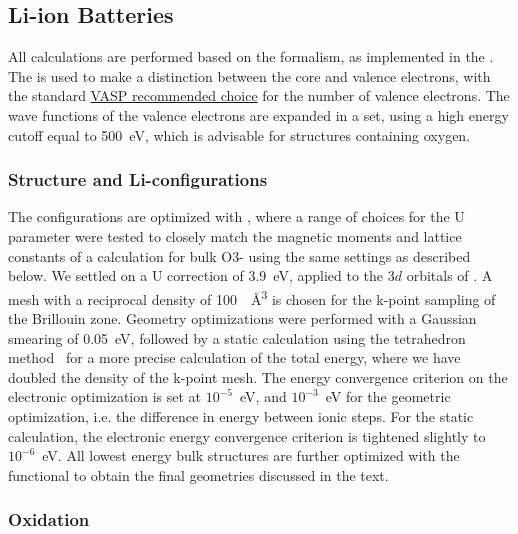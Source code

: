 \begin{refsection}
\subsection{Li-ion Batteries} 

All calculations are performed based on the  formalism, as 
implemented in the . The  is used to make a 
distinction between the core and valence electrons, with the standard 
\href{https://cms.mpi.univie.ac.at/vasp/vasp/Recommended_PAW_potentials_DFT_calculations_using_vasp_5_2.html}{VASP recommended choice} for the 
number of valence electrons. The wave functions of the valence electrons are 
expanded in a  set, using a high energy cutoff equal to 
500~\si{\electronvolt}, which is advisable for structures containing oxygen. 

\subsubsection{Structure and Li-configurations} \label{appendix:sec-structure} 

The configurations are optimized with , where a range of choices 
for the U parameter were tested to closely match the magnetic moments and 
lattice constants of a  calculation for bulk O3- using 
the same settings as described below. We settled on a U correction of 
3.9~\si{\electronvolt}, applied to the 3$d$ orbitals of . A 
mesh with a reciprocal density of 100~\si{\per\angstrom\cubed} is chosen for the 
k-point sampling of the Brillouin zone. Geometry optimizations were performed 
with a Gaussian smearing of 0.05~\si{\electronvolt}, followed by a static 
calculation using the tetrahedron method~\cite{Blochl1994a} for a more precise 
calculation of the total energy, where we have doubled the density of the 
k-point mesh. The energy convergence criterion on the 
electronic optimization is set at $10^{-5}$~\si{\electronvolt}, and 
$10^{-3}$~\si{\electronvolt} for the geometric optimization, i.e. the 
difference in energy between ionic steps. For the static calculation, the 
electronic energy convergence criterion is tightened slightly to 
$10^{-6}$~\si{\electronvolt}. All lowest energy bulk structures are 
further optimized with the  functional to obtain the final 
geometries discussed in the text. 

 \label{appendix:sec-oxidation} 
\subsubsection{Oxidation}


\end{refsection}
